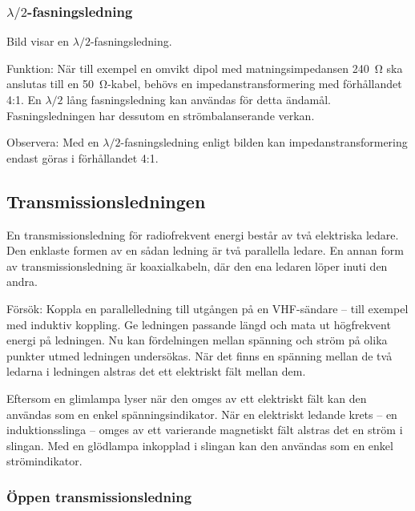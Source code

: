 \subsubsection{$\lambda/2$-fasningsledning}


Bild  visar en $\lambda/2$-fasningsledning.

Funktion: När till exempel en omvikt dipol med matningsimpedansen \qty{240}{\ohm}
ska anslutas till en \qty{50}{\ohm}-kabel, behövs en impedanstransformering med
förhållandet 4:1.
En \(\lambda/2\) lång fasningsledning kan användas för detta ändamål.
Fasningsledningen har dessutom en strömbalanserande verkan.

Observera: Med en \(\lambda/2\)-fasningsledning enligt bilden kan
impedanstransformering endast göras i förhållandet 4:1.

\subsection{Transmissionsledningen}

En transmissionsledning för radiofrekvent energi består av två elektriska
ledare.
Den enklaste formen av en sådan ledning är två parallella ledare.
En annan form av transmissionsledning är koaxialkabeln, där den ena ledaren
löper inuti den andra.

Försök: Koppla en parallelledning till utgången på en VHF-sändare --
till exempel med induktiv koppling.
Ge ledningen passande längd och mata ut högfrekvent energi på ledningen.
Nu kan fördelningen mellan spänning och ström på olika punkter utmed ledningen
undersökas.
När det finns en spänning mellan de två ledarna i ledningen alstras det ett
elektriskt fält mellan dem.

Eftersom en glimlampa lyser när den omges av ett elektriskt fält kan den
användas som en enkel spänningsindikator.
När en elektriskt ledande krets -- en induktionsslinga -- omges av ett
varierande magnetiskt fält alstras det en ström i slingan.
Med en glödlampa inkopplad i slingan kan den användas som en enkel
strömindikator.

\subsubsection{Öppen transmissionsledning}

